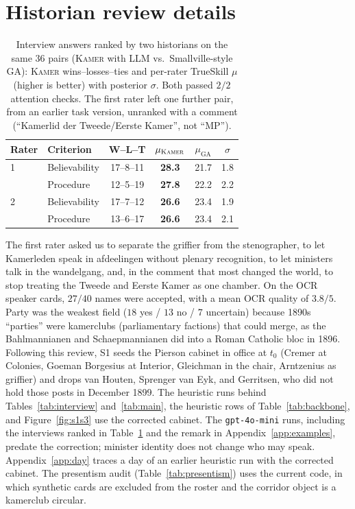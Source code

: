 \documentclass[sigconf,review,anonymous]{acmart}
\newcommand{\sys}{\textsc{Kamer}}
\begin{document}
\section{Historian review details}
\label{app:historian}
\begin{table}[t]
\caption{Interview answers ranked by two historians on the same 36 pairs
(\sys{} with LLM vs.\ Smallville-style GA): \sys{} wins--losses--ties
and per-rater TrueSkill $\mu$ (higher is better) with posterior $\sigma$.
Both passed $2/2$ attention checks. The first rater left one further pair,
from an earlier task version, unranked with a comment (``Kamerlid der
Tweede/Eerste Kamer'', not ``MP'').}
\label{tab:historian}
\centering\small
\setlength{\tabcolsep}{4pt}
\begin{tabular}{llcccc}
\toprule
Rater & Criterion & W--L--T & $\mu_{\text{\sys{}}}$ & $\mu_{\text{GA}}$ & $\sigma$ \\
\midrule
1 & Believability & 17--8--11 & \textbf{28.3} & 21.7 & 1.8 \\
  & Procedure & 12--5--19 & \textbf{27.8} & 22.2 & 2.2 \\
2 & Believability & 17--7--12 & \textbf{26.6} & 23.4 & 1.9 \\
  & Procedure & 13--6--17 & \textbf{26.6} & 23.4 & 2.1 \\
\bottomrule
\end{tabular}
\end{table}
The first rater
asked us to separate the griffier from the stenographer, to let Kamerleden
speak in afdeelingen without plenary recognition, to let ministers talk in
the wandelgang, and, in the comment that most changed the world, to stop
treating the Tweede and Eerste Kamer as one chamber. On the OCR speaker
cards, $27/40$ names were accepted, with a mean OCR quality of $3.8/5$.
Party was the weakest field ($18$ yes / $13$ no / $7$ uncertain) because
1890s ``parties'' were kamerclubs (parliamentary factions) that could
merge, as the Bahlmannianen and Schaepmannianen did into a Roman Catholic
bloc in 1896. Following this review, S1 seeds the Pierson cabinet in office
at $t_0$ (Cremer at Colonies, Goeman Borgesius at Interior, Gleichman in
the chair, Arntzenius as griffier) and drops van Houten, Sprenger van Eyk,
and Gerritsen, who did not hold those posts in December 1899. The heuristic
runs behind Tables~\ref{tab:interview} and~\ref{tab:main}, the heuristic
rows of Table~\ref{tab:backbone}, and Figure~\ref{fig:s1s3} use the
corrected cabinet. The \texttt{gpt-4o-mini} runs, including the interviews
ranked in Table~\ref{tab:historian} and the remark in
Appendix~\ref{app:examples}, predate the correction; minister identity does
not change who may speak. Appendix~\ref{app:day} traces a day of an earlier
heuristic run with the corrected cabinet. The presentism audit
(Table~\ref{tab:presentism}) uses the current code, in which synthetic
cards are excluded from the roster and the corridor object is a kamerclub
circular.
\end{document}
